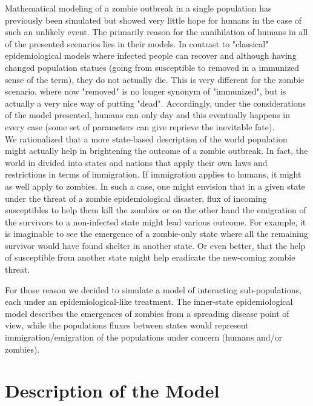 \documentclass[11pt]{article}
\begin{document}
Mathematical modeling of a zombie outbreak in a single population has previously been simulated \cite{munz2009zombies} but showed very little hope for humans in the case of such an unlikely event. The primarily reason for the annihilation of humans in all of the presented scenarios lies in their models. In contrast to "classical" epidemiological models where infected people can recover and although having changed population statues (going from susceptible to removed in a immunized sense of the term), they do not actually die. This is very different for the zombie scenario, where now "removed" is no longer synonym of "immunized", but is actually a very nice way of putting "dead". Accordingly, under the considerations of the model presented, humans can only day and this eventually happens in every case (some set of parameters can give reprieve the inevitable fate).\\

We rationalized that a more state-based description of the world population might actually help in brightening the outcome of a zombie outbreak. In fact, the world in divided into states and nations that apply their own laws and restrictions in terms of immigration. If immigration applies to humans, it might as well apply to zombies. In such a case, one might envision that in a given state under the threat of a zombie epidemiological disaster, flux of incoming susceptibles to help them kill the zombies or on the other hand the emigration of the survivors to a non-infected state might lead various outcome. For example, it is imaginable to see the emergence of a zombie-only state where all the remaining survivor would have found shelter in another state. Or even better, that the help of susceptible from another state might help eradicate the new-coming zombie threat. 

For those reason we decided to simulate a model of interacting sub-populations, each under an epidemiological-like treatment. The inner-state epidemiological model describes the emergences of zombies from a spreading disease point of view, while the populations fluxes between states would represent immigration/emigration of the populations under concern (humans and/or zombies). 

\section{Description of the Model}\indent
\end{document}
